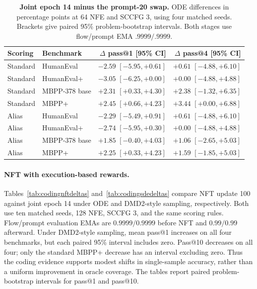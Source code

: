 \documentclass[11pt,letterpaper]{article}
\begin{document}
\begin{table}[htbp]
\centering\small
\setlength{\tabcolsep}{3pt}
\caption{\textbf{Joint epoch 14 minus the prompt-20 swap.} ODE differences in percentage points at 64 NFE and SCCFG 3, using four matched seeds. Brackets give paired 95\% problem-bootstrap intervals. Both stages use flow/prompt EMA $.9999/.9999$.}
\label{tab:codingjointdeltas}
\begin{tabular}{@{}llrr@{}}
\toprule
Scoring & Benchmark & $\Delta$ pass@1 [95\% CI] & $\Delta$ pass@4 [95\% CI]\\
\midrule
Standard & HumanEval & $-2.59$ {\scriptsize $[-5.95,+0.61]$} & $+0.61$ {\scriptsize $[-4.88,+6.10]$}\\
Standard & HumanEval+ & $-3.05$ {\scriptsize $[-6.25,+0.00]$} & $+0.00$ {\scriptsize $[-4.88,+4.88]$}\\
Standard & MBPP-378 base & $+2.31$ {\scriptsize $[+0.33,+4.30]$} & $+2.38$ {\scriptsize $[-1.32,+6.35]$}\\
Standard & MBPP+ & $+2.45$ {\scriptsize $[+0.66,+4.23]$} & $+3.44$ {\scriptsize $[+0.00,+6.88]$}\\
\midrule
Alias & HumanEval & $-2.29$ {\scriptsize $[-5.49,+0.91]$} & $+0.61$ {\scriptsize $[-4.88,+6.10]$}\\
Alias & HumanEval+ & $-2.74$ {\scriptsize $[-5.95,+0.30]$} & $+0.00$ {\scriptsize $[-4.88,+4.88]$}\\
Alias & MBPP-378 base & $+1.85$ {\scriptsize $[-0.40,+4.03]$} & $+1.06$ {\scriptsize $[-2.65,+5.03]$}\\
Alias & MBPP+ & $+2.25$ {\scriptsize $[+0.33,+4.23]$} & $+1.59$ {\scriptsize $[-1.85,+5.03]$}\\
\bottomrule
\end{tabular}
\end{table}

\paragraph{NFT with execution-based rewards.}
Tables~\ref{tab:codingnftdeltas} and~\ref{tab:codingsdedeltas} compare NFT update 100 against joint epoch 14 under ODE and DMD2-style sampling, respectively. Both use ten matched seeds, 128 NFE, SCCFG 3, and the same scoring rules. Flow/prompt evaluation EMAs are $0.9999/0.9999$ before NFT and $0.99/0.99$ afterward. Under DMD2-style sampling, mean pass@1 increases on all four benchmarks, but each paired 95\% interval includes zero. Pass@10 decreases on all four; only the standard MBPP+ decrease has an interval excluding zero. Thus the coding evidence supports modest shifts in single-sample accuracy, rather than a uniform improvement in oracle coverage. The tables report paired problem-bootstrap intervals for pass@1 and pass@10.
\end{document}
